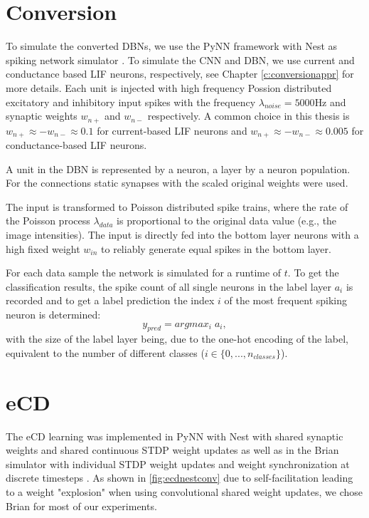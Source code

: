 \section{Conversion} \label{c:conversionimpl}

To simulate the converted DBNs, we use the PyNN framework with Nest as spiking network simulator \cite{10.3389/neuro.11.011.2008, Gewaltig:NEST}.
To simulate the CNN and DBN, we use current and conductance based LIF neurons, respectively, see Chapter \ref{c:conversionappr} for more details.
Each unit is injected with high frequency Possion distributed excitatory and inhibitory input spikes with the frequency $\lambda_{noise}= 5000 \text{Hz}$ and synaptic weights $w_{n+}$ and $w_{n-}$ respectively.
A common choice in this thesis is $w_{n+} \approx - w_{n-} \approx 0.1$ for current-based LIF neurons and  $w_{n+} \approx - w_{n-} \approx 0.005$ for conductance-based LIF neurons.

A unit in the DBN is represented by a neuron, a layer by a neuron population.
For the connections static synapses with the scaled original weights were used. 

The input is transformed to Poisson distributed spike trains, where the rate of the Poisson process $\lambda_{data}$ is proportional to the original data value (e.g., the image intensities). 
The input is directly fed into the bottom layer neurons with a high fixed weight $w_{in}$ to reliably generate equal spikes in the bottom layer.    

For each data sample the network is simulated for a runtime of $t$. 
To get the classification results, the spike count of all single neurons in the label layer $a_i$ is recorded and to get a label prediction the index $i$ of the most frequent spiking neuron is determined:
\[
y_{pred} = argmax_i \; a_i,
\]
with the size of the label layer being, due to the one-hot encoding of the label, equivalent to the number of different classes ($i \in \{0,..., n_{classes}\}$). 

\section{eCD} \label{c:ecdimpl}

The eCD learning was implemented in PyNN with Nest with shared synaptic weights and shared continuous STDP weight updates as well as in the Brian simulator with individual STDP weight updates and weight synchronization at discrete timesteps \cite{10.3389/neuro.11.011.2008, Gewaltig:NEST, 10.3389/neuro.11.005.2008}. 
As shown in \ref{fig:ecdnestconv} due to self-facilitation leading to a weight "explosion" when using convolutional shared weight updates, we chose Brian for most of our experiments.

